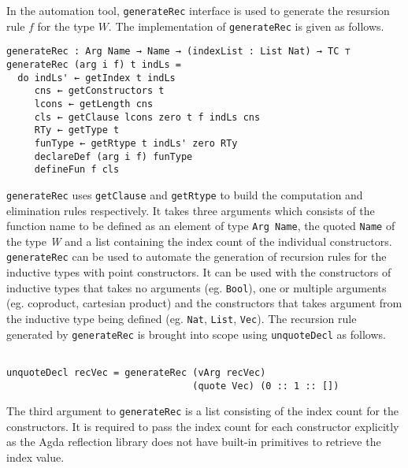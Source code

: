 \documentclass[sigplan,10pt]{acmart}
\begin{document}
In the automation tool, {\tt generateRec} interface is used to generate the resursion rule $f$ for the type $W$. The implementation of {\tt generateRec} is given as follows.

\begin{center}
\begingroup
\fontsize{7pt}{9pt}\selectfont
\begin{Verbatim}
generateRec : Arg Name → Name → (indexList : List Nat) → TC ⊤
generateRec (arg i f) t indLs =
  do indLs' ← getIndex t indLs
     cns ← getConstructors t
     lcons ← getLength cns
     cls ← getClause lcons zero t f indLs cns
     RTy ← getType t
     funType ← getRtype t indLs' zero RTy
     declareDef (arg i f) funType
     defineFun f cls
\end{Verbatim}
\endgroup
\end{center}

\normalsize

{\tt generateRec} uses {\tt getClause} and {\tt getRtype} to build the computation and elimination rules respectively. It takes three arguments which consists of the function name to be defined as an element of type {\tt Arg Name}, the quoted {\tt Name} of the type \emph{W} and a list containing the index count of the individual constructors. {\tt generateRec} can be used to automate the generation of recursion rules for the inductive types with point constructors. It can be used with the constructors of inductive types that takes no arguments (eg. {\tt Bool}), one or multiple arguments (eg. coproduct, cartesian product) and the constructors that takes argument from the inductive type being defined (eg. {\tt Nat}, {\tt List}, {\tt Vec}). The recursion rule generated by {\tt generateRec} is brought into scope using {\tt unquoteDecl} as follows.

\begin{center}
\begingroup
\fontsize{8pt}{9pt}\selectfont
\begin{Verbatim}

unquoteDecl recVec = generateRec (vArg recVec)
                                 (quote Vec) (0 :: 1 :: [])

\end{Verbatim}
\endgroup
\end{center}

\normalsize

The third argument to {\tt generateRec} is a list consisting of the index count for the constructors. It is required to pass the index count for each constructor explicitly as the Agda reflection library does not have built-in primitives to retrieve the index value.
\end{document}
